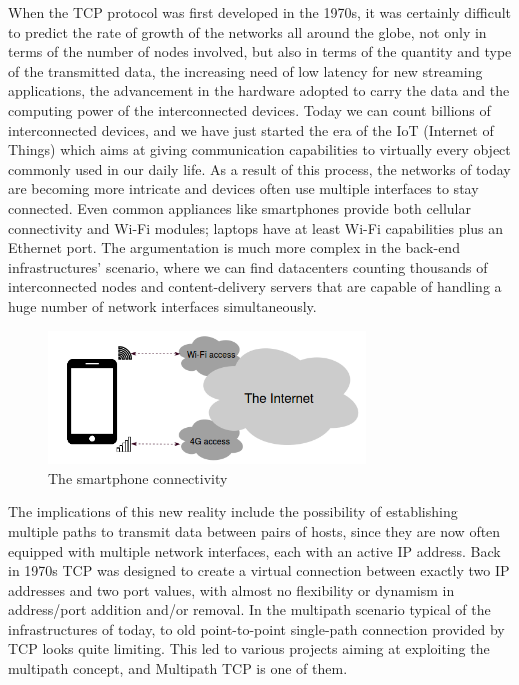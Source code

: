 \vspace{5mm}
When the TCP protocol was first developed in the 1970s, it was certainly difficult to predict the rate of growth of the networks all around the globe, not only in terms of the number of nodes involved, but also in terms of the quantity and type of the transmitted data, the increasing need of low latency for new streaming applications, the advancement in the hardware adopted to carry the data and the computing power of the interconnected devices. Today we can count billions of interconnected devices, and we have just started the era of the IoT (Internet of Things) which aims at giving communication capabilities to virtually every object commonly used in our daily life.
As a result of this process, the networks of today are becoming more intricate and devices often use multiple interfaces to stay connected. Even common appliances like smartphones provide both cellular connectivity and Wi-Fi modules; laptops have at least Wi-Fi capabilities plus an Ethernet port. The argumentation is much more complex in the back-end infrastructures' scenario, where we can find datacenters counting thousands of interconnected nodes and content-delivery servers that are capable of handling a huge number of network interfaces simultaneously.

\begin{figure}[!htb]
\centering
\includegraphics[width=0.75\textwidth]{images/smartphones}
\caption{The smartphone connectivity}
\label{fig:networkscenario}
\end{figure}

The implications of this new reality include the possibility of establishing multiple paths to transmit data between pairs of hosts, since they are now often equipped with multiple network interfaces, each with an active IP address. Back in 1970s TCP was designed to create a virtual connection between exactly two IP addresses and two port values, with almost no flexibility or dynamism in address/port addition and/or removal. In the multipath scenario typical of the infrastructures of today, to old point-to-point single-path connection provided by TCP looks quite limiting. This led to various projects aiming at exploiting the multipath concept, and Multipath TCP is one of them.


